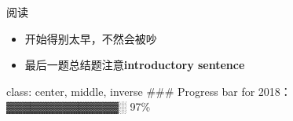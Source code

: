 \documentclass[ignorenonframetext,]{beamer}
\begin{document}
\begin{frame}{阅读}
\protect\hypertarget{ux9605ux8bfb}{}

\begin{itemize}
\item
  开始得别太早，不然会被吵
\item
  最后一题总结题注意\textbf{introductory sentence}
\end{itemize}

\end{frame}

\begin{frame}

class: center, middle, inverse \#\#\# Progress bar for
2018：▓▓▓▓▓▓▓▓▓▓▓▓▓▓░ 97\%

\end{frame}
\end{document}
